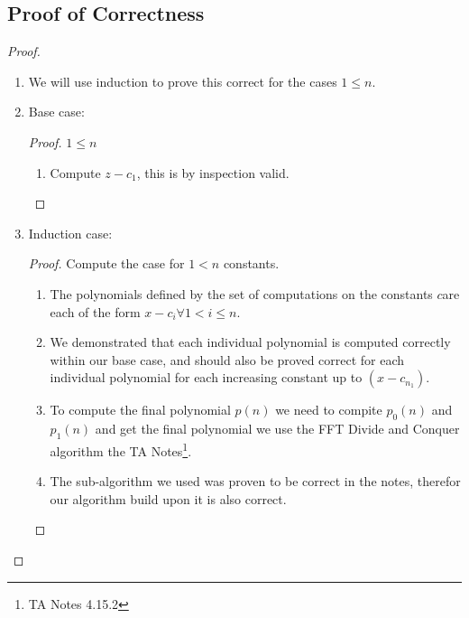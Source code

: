 \documentclass{article}
\begin{document}
\subsection{Proof of Correctness}
\begin{proof}
      \begin{enumerate}
            \item We will use induction to prove this correct for the cases \(1 \leq n\).
            \item Base case:
                  \begin{proof} \(1 \leq n\)
                        \begin{enumerate}
                              \item Compute \(z - c_1\), this is by inspection valid.
                        \end{enumerate}
                  \end{proof}
            \item Induction case:
                  \begin{proof} Compute the case for \(1 < n\) constants.
                        \begin{enumerate}
                              \item The polynomials defined by the set of computations on
                                    the constants \(c\)are each of the form \(x -
                                    c_i \forall 1 < i \leq n \).
                              \item We demonstrated that each individual polynomial is
                                    computed correctly within our base case, and should also be
                                    proved correct for each individual polynomial for each
                                    increasing constant up to \((x - c_{n_1})\).
                              \item To compute the final polynomial \(p(n)\) we need to
                                    compite \(p_0(n) \) and \(p_1(n)\) and get the final
                                    polynomial we use the FFT Divide and Conquer algorithm
                                    the TA Notes\footnote{TA Notes 4.15.2}.
                              \item The sub-algorithm we used was proven to be correct in
                                    the notes, therefor our algorithm build upon it is
                                    also correct.

                        \end{enumerate}
                  \end{proof}
      \end{enumerate}
\end{proof}
\end{document}
